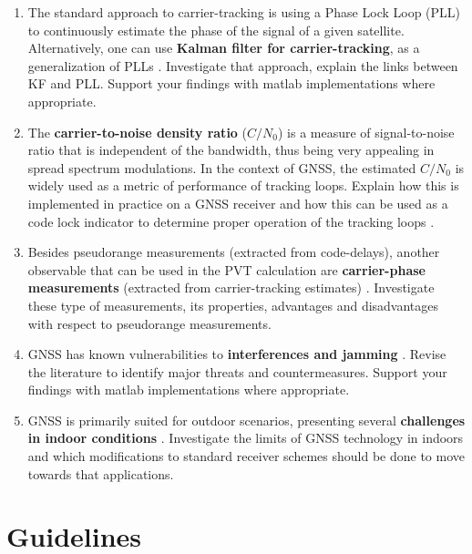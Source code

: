 \documentclass[11pt]{article}
\begin{document}
\begin{enumerate}
    \item The standard approach to carrier-tracking is using a Phase Lock Loop (PLL) to continuously estimate the phase of the signal of a given satellite. Alternatively, one can use \textbf{Kalman filter for carrier-tracking}, as a generalization of PLLs \cite{vila2017plls}. Investigate that approach, explain the links between KF and PLL. Support your findings with matlab implementations where appropriate.
    \item The \textbf{carrier-to-noise density ratio} ($C/N_0$) is a measure of signal-to-noise ratio that is independent of the bandwidth, thus being very appealing in spread spectrum modulations. In the context of GNSS, the estimated $C/N_0$ is widely used as a metric of performance of tracking loops. Explain how this is implemented in practice on a GNSS receiver and how this can be used as a code lock indicator to determine proper operation of the tracking loops \cite{falletti2010carrier}.
    \item Besides pseudorange measurements (extracted from code-delays), another observable that can be used in the PVT calculation are \textbf{carrier-phase measurements} (extracted from carrier-tracking estimates) \cite{subirana2013gnss}. Investigate these type of measurements, its properties, advantages and disadvantages with respect to pseudorange measurements. 
    \item GNSS has known vulnerabilities to \textbf{interferences and jamming} \cite{ioannides2016known,borio2016impact}. Revise the literature to identify major threats and countermeasures. Support your findings with matlab implementations where appropriate.  
    \item GNSS is primarily suited for outdoor scenarios, presenting several \textbf{challenges in indoor conditions} \cite{6153154}. Investigate the limits of GNSS technology in indoors and which modifications to standard receiver schemes should be done to move towards that applications.
\end{enumerate}


\section*{Guidelines}
\end{document}
